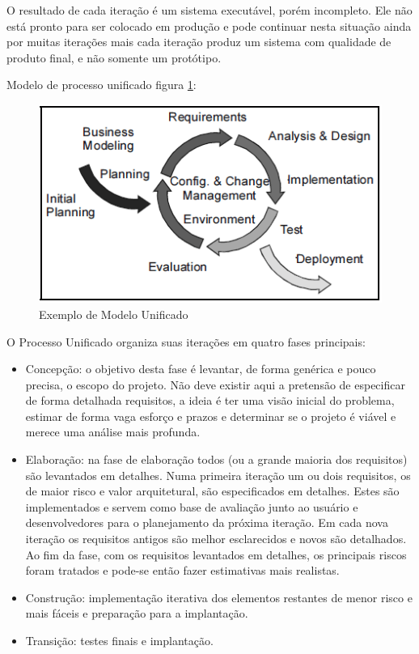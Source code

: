 \documentclass[	DIV=calc,%
							paper=a4,%
							fontsize=12pt,%
							onecolumn]{scrartcl}	 					%
\begin{document}
 O resultado de cada iteração é um sistema executável, porém incompleto. Ele não está pronto para ser colocado em produção e pode continuar nesta situação ainda por muitas iterações mais cada iteração produz um sistema com qualidade de produto final, e não somente um protótipo.
 
  Modelo de processo unificado figura \ref{rup1}: 
 \begin{figure}
	\centering
	\includegraphics[]{rup1.png}
	\caption{Exemplo de Modelo Unificado}
	\label{rup1}
\end{figure}
 
 O Processo Unificado organiza suas iterações em quatro fases principais:
\begin{itemize}

\item Concepção: o objetivo desta fase é levantar, de forma genérica e pouco precisa, o escopo do projeto. Não deve existir aqui a pretensão de especificar de forma detalhada requisitos, a ideia é ter uma visão inicial do problema, estimar de forma vaga esforço e prazos e determinar se o projeto é viável e merece uma análise mais profunda.

\item Elaboração: na fase de elaboração todos (ou a grande maioria dos requisitos) são levantados em detalhes. Numa primeira iteração um ou dois requisitos, os de maior risco e valor arquitetural, são especificados em detalhes. Estes são implementados e servem como base de avaliação junto ao usuário e desenvolvedores para o planejamento da próxima iteração. Em cada nova iteração os requisitos antigos são melhor esclarecidos e novos são detalhados. Ao fim da fase, com os requisitos levantados em detalhes, os principais riscos foram tratados e pode-se então fazer estimativas mais realistas.

\item Construção: implementação iterativa dos elementos restantes de menor risco e mais fáceis e preparação para a implantação.

\item Transição: testes finais e implantação.

\end{itemize}
\end{document}
